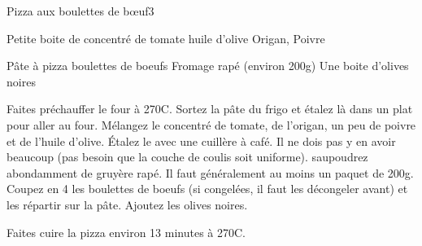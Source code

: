 \begin{recette}{Pizza aux boulettes de bœuf}{3}{}{}

\begin{ingredients}
\ingredient Petite boite de concentré de tomate
\ingredient huile d'olive
\ingredient Origan, Poivre

\ingredient Pâte à pizza
 boulettes de boeufs
\ingredient Fromage rapé (environ 200g)
\ingredient Une boite d'olives noires
\end{ingredients}

\begin{preparation}
\etape Faites préchauffer le four à 270\degres C.
\etape Sortez la pâte du frigo et étalez là dans un plat pour aller au four.
\etape Mélangez le concentré de tomate, de l'origan, un peu de poivre et de l'huile d'olive.
\etape Étalez le avec une cuillère à café. Il ne dois pas y en avoir beaucoup (pas besoin que la couche de coulis soit uniforme).
\etape saupoudrez abondamment de gruyère rapé. Il faut généralement au moins un paquet de 200g.
\etape Coupez en 4 les boulettes de boeufs (si congelées, il faut les décongeler avant) et les répartir sur la pâte.
\etape Ajoutez les olives noires.
\end{preparation}

\begin{cuisson}
Faites cuire la pizza environ 13 minutes à 270\degres C.
\end{cuisson}
\end{recette}

